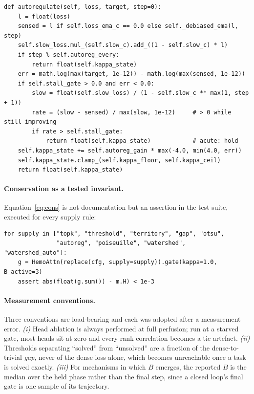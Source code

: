 \documentclass[11pt]{report}
\theoremstyle{plain}
\theoremstyle{definition}
\theoremstyle{remark}
\begin{document}
\begin{lstlisting}[caption={The controller. \texttt{stall\_gate} $> 0$ enables
Algorithm~\ref{alg:stall}; with \texttt{loss\_ema} $=0$ and \texttt{autoreg\_every} $=1$
the sensed loss is the raw minibatch loss.}, label={lst:loop}]
def autoregulate(self, loss, target, step=0):
    l = float(loss)
    sensed = l if self.loss_ema_c == 0.0 else self._debiased_ema(l, step)
    self.slow_loss.mul_(self.slow_c).add_((1 - self.slow_c) * l)
    if step % self.autoreg_every:
        return float(self.kappa_state)
    err = math.log(max(target, 1e-12)) - math.log(max(sensed, 1e-12))
    if self.stall_gate > 0.0 and err < 0.0:
        slow = float(self.slow_loss) / (1 - self.slow_c ** max(1, step + 1))
        rate = (slow - sensed) / max(slow, 1e-12)     # > 0 while still improving
        if rate > self.stall_gate:
            return float(self.kappa_state)            # acute: hold
    self.kappa_state += self.autoreg_gain * max(-4.0, min(4.0, err))
    self.kappa_state.clamp_(self.kappa_floor, self.kappa_ceil)
    return float(self.kappa_state)
\end{lstlisting}

\paragraph{Conservation as a tested invariant.}
Equation~\eqref{eq:cons} is not documentation but an assertion in the test suite, executed
for every supply rule:
\begin{lstlisting}[numbers=none]
for supply in ["topk", "threshold", "territory", "gap", "otsu",
               "autoreg", "poiseuille", "watershed", "watershed_auto"]:
    g = HemoAttn(replace(cfg, supply=supply)).gate(kappa=1.0, B_active=3)
    assert abs(float(g.sum()) - m.H) < 1e-3
\end{lstlisting}

\paragraph{Measurement conventions.}
Three conventions are load-bearing and each was adopted after a measurement error.
\emph{(i)} Head ablation is always performed at full perfusion; run at a starved gate,
most heads sit at zero and every rank correlation becomes a tie artefact. \emph{(ii)}
Thresholds separating ``solved'' from ``unsolved'' are a fraction of the dense-to-trivial
\emph{gap}, never of the dense loss alone, which becomes unreachable once a task is solved
exactly. \emph{(iii)} For mechanisms in which $B$ emerges, the reported $B$ is the median
over the held phase rather than the final step, since a closed loop's final gate is one
sample of its trajectory.
\end{document}
